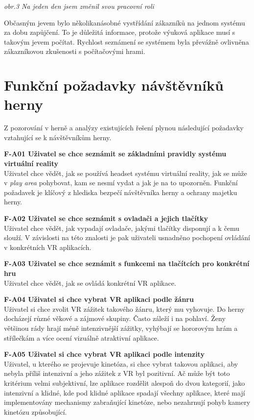 \emph{obr.3 Na jeden den jsem změnil svou pracovní roli}

Občasným jevem bylo několikanásobné vystřídání zákazníků na jednom
systému za dobu zapůjčení. To je důležitá informace, protože výuková
aplikace musí s takovým jevem počítat. Rychlost seznámení se systémem
byla převážně ovlivněna zákazníkovou zkušenosti s počítačovými hrami.

\section{Funkční požadavky návštěvníků
herny}\label{funkux10dnuxed-poux17eadavky-nuxe1vux161tux11bvnuxedkux16f-herny}

Z pozorování v herně a analýzy existujících řešení plynou následující
požadavky vztahující se k návštěvníkům herny.

\textbf{F-A01 Uživatel se chce seznámit se základními pravidly systému
virtuální reality}\\
Uživatel chce vědět, jak se používá headset systému virtuální reality,
jak se může v \emph{play area} pohybovat, kam se nesmí vydat a jak je na
to upozorněn. Funkční požadavek je klíčový z hlediska bezpečí
návštěvníka herny a ochrany majetku herny.

\textbf{F-A02 Uživatel se chce seznámit s ovladači a jejich tlačítky}\\
Uživatel chce vědět, jak vypadají ovladače, jakými tlačítky disponují a
k čemu slouží. V závislosti na této znalosti je pak uživateli usnadněno
pochopení ovládání v konkrétních VR aplikacích.

\textbf{F-A03 Uživatel se chce seznámit s funkcemi na tlačítcích pro
konkrétní hru}\\
Uživatel chce vědět, jak se ovládá konkrétní VR aplikace.

\textbf{F-A04 Uživatel si chce vybrat VR aplikaci podle žánru}\\
Uživatel si chce zvolit VR zážitek takového žánru, který mu vyhovuje. Do
herny docházejí různé věkové a zájmové skupiny. Často záleží i na
pohlaví. Ženy většinou rády hrají méně intenzivnější zážitky, vyhýbají
se hororovým hrám a střílečkám a více ocení vizuálně atraktivní
aplikace.

\textbf{F-A05 Uživatel si chce vybrat VR aplikaci podle intenzity}\\
Uživatel, u kterého se projevuje kinetóza, si chce vybrat takovou
aplikaci, aby nebyla příliš intenzivní a jeho zážitek z VR byl
pozitivní. Ač může být toto kritérium velmi subjektivní, lze aplikace
rozdělit alespoň do dvou kategorií, jako intenzivní a klidné, kde pod
klidné aplikace spadají všechny aplikace, které mají implementovány
mechanismy zabraňující kinetóze, nebo nezahrnují pohyb kamery kinetózu
způsobující.

